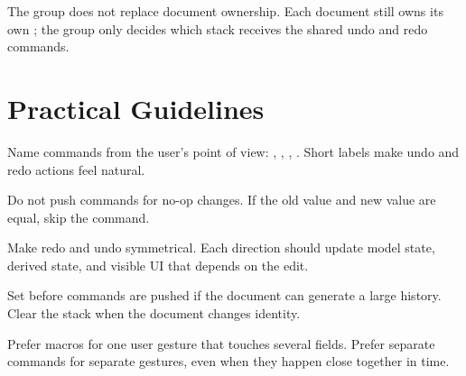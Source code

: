 The group does not replace document ownership. Each document still owns its own ; the group only decides which stack receives the shared undo and redo commands.

\section{Practical Guidelines}

Name commands from the user's point of view: , , , . Short labels make undo and redo actions feel natural.

Do not push commands for no-op changes. If the old value and new value are equal, skip the command.

Make redo and undo symmetrical. Each direction should update model state, derived state, and visible UI that depends on the edit.

Set  before commands are pushed if the document can generate a large history. Clear the stack when the document changes identity.

Prefer macros for one user gesture that touches several fields. Prefer separate commands for separate gestures, even when they happen close together in time.
